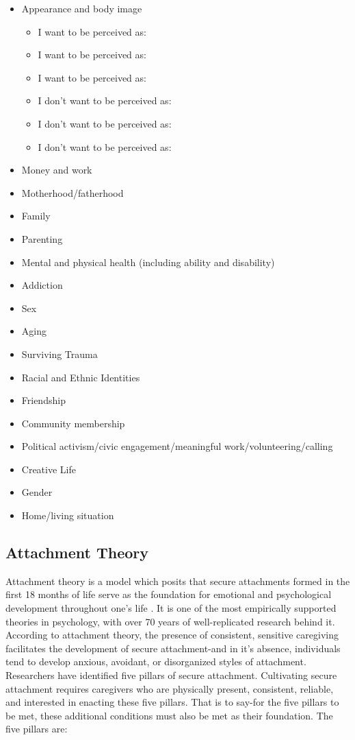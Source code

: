 \documentclass[12pt,letterpaper]{article}
\begin{document}
\begin{itemize}
    \item Appearance and body image
    \begin{itemize}
        \item I want to be perceived as:
        \item I want to be perceived as:
        \item I want to be perceived as:
        \item I don't want to be perceived as:
        \item I don't want to be perceived as:
        \item I don't want to be perceived as:
    \end{itemize}
    \item Money and work
    \item Motherhood/fatherhood
    \item Family
    \item Parenting
    \item Mental and physical health (including ability and disability)
    \item Addiction
    \item Sex
    \item Aging
    \item Surviving Trauma
    \item Racial and Ethnic Identities
    \item Friendship
    \item Community membership
    \item Political activism/civic engagement/meaningful work/volunteering/calling
    \item Creative Life
    \item Gender
    \item Home/living situation
\end{itemize}
\subsection{Attachment Theory}
\label{attachment}
Attachment theory is a model which posits that secure attachments formed in the first 18 months of life serve as the foundation for emotional and psychological development throughout one's life \cite{brownAttachmentDisturbances}. It is one of the most empirically supported theories in psychology, with over 70 years of well-replicated research behind it. According to attachment theory, the presence of consistent, sensitive caregiving facilitates the development of secure attachment-and in it's absence, individuals tend to develop anxious, avoidant, or disorganized styles of attachment. Researchers have identified five pillars of secure attachment. Cultivating secure attachment requires caregivers who are physically present, consistent, reliable, and interested in enacting these five pillars. That is to say-for the five pillars to be met, these additional conditions must also be met as their foundation. The five pillars are:
\end{document}
